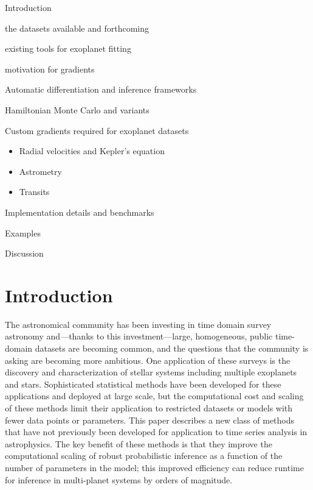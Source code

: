 \documentclass[modern]{aastex62}
\begin{document}
\begin{enumerate}

{\item Introduction
\begin{itemize}
{\item the datasets available and forthcoming}
{\item existing tools for exoplanet fitting}
{\item motivation for gradients}
\end{itemize}}

\item Automatic differentiation and inference frameworks

\item Hamiltonian Monte Carlo and variants

\item Custom gradients required for exoplanet datasets
\begin{itemize}
\item Radial velocities and Kepler's equation
\item Astrometry
\item Transits
\end{itemize}

\item Implementation details and benchmarks

\item Examples

\item Discussion

\end{enumerate}

\section{Introduction}

The astronomical community has been investing in time domain survey astronomy and---thanks to this investment---large, homogeneous, public time-domain datasets are becoming common, and the questions that the community is asking are becoming more ambitious.
One application of these surveys is the discovery and characterization of stellar systems including multiple exoplanets and stars.
Sophisticated statistical methods have been developed for these applications and deployed at large scale, but the computational cost and scaling of these methods limit their application to restricted datasets or models with fewer data points or parameters.
This paper describes a new class of methods that have not previously been developed for application to time series analysis in astrophysics.
The key benefit of these methods is that they improve the computational scaling of robust probabilistic inference as a function of the number of parameters in the model; this improved efficiency can reduce runtime for inference in multi-planet systems by orders of magnitude.
\end{document}
